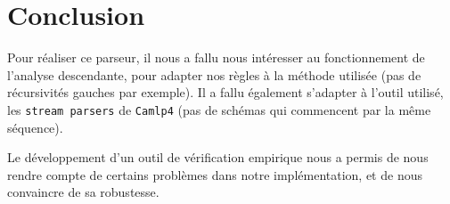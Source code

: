 \documentclass[11pt]{article}
\begin{document}
\section{Conclusion}
Pour réaliser ce parseur, il nous a fallu nous intéresser au fonctionnement de l'analyse descendante, pour adapter nos règles à la méthode utilisée (pas de récursivités gauches par exemple). Il a fallu également s'adapter à l'outil utilisé, les \texttt{stream parsers} de \texttt{Camlp4} (pas de schémas qui commencent par la même séquence).

Le développement d'un outil de vérification empirique nous a permis de nous rendre compte de certains problèmes dans notre implémentation, et de nous convaincre de sa robustesse.
\end{document}
